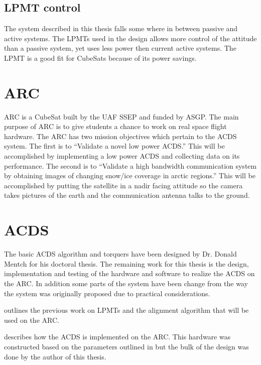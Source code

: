 \subsection{\acl{LPMT} control}

The system described in this thesis falls some where in between passive and active systems. The \acp{LPMT} used in the design allows more control of the attitude than a passive system, yet uses less power then current active systems. The \ac{LPMT} is a good fit for CubeSats because of its power savings.

\section{\acl{ARC}}

\ac{ARC} is a CubeSat built by the \ac{UAF} \ac{SSEP} and funded by \ac{ASGP}. The main purpose of \ac{ARC} is to give students a chance to work on real space flight hardware. The \ac{ARC} has two mission objectives which pertain to the \ac{ACDS} system. The first is to ``Validate a novel low power \ac{ACDS}.''\cite{ARCcdr} This will be accomplished by implementing a low power \ac{ACDS} and collecting data on its performance. The second is to ``Validate a high bandwidth communication system by obtaining images of changing snow/ice coverage in arctic regions.''\cite{ARCcdr} This will be accomplished by putting the satellite in a nadir facing attitude so the camera takes pictures of the earth and the communication antenna talks to the ground.

\section{\acl{ACDS}}

The basic \ac{ACDS} algorithm and torquers have been designed by Dr. Donald Mentch for his doctoral thesis. The remaining work for this thesis is the design, implementation and testing of the hardware and software to realize the \ac{ACDS} on the \ac{ARC}. In addition some parts of the system have been change from the way the system was originally proposed due to practical considerations.

 outlines the previous work on \acp{LPMT} and the alignment algorithm that will be used on the \ac{ARC}.

 describes how the \ac{ACDS} is implemented on the \ac{ARC}. This hardware was constructed based on the parameters outlined in \cite{Mentch11} but the bulk of the design was done by the author of this thesis.

